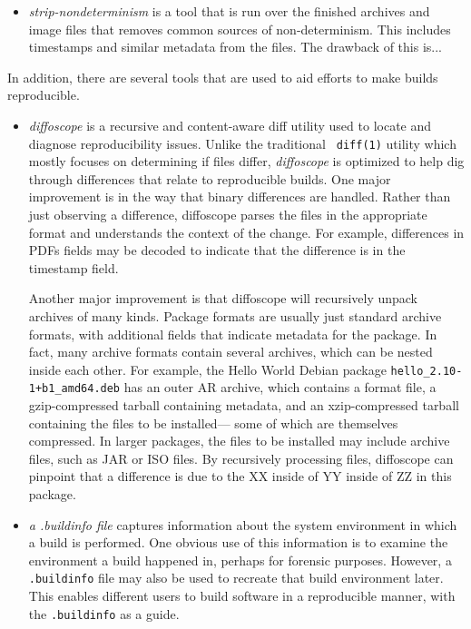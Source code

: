 \begin{itemize}



\item {\em strip-nondeterminism} is a tool that is run over the finished
archives and image files that removes common sources of non-determinism.
This includes timestamps and similar metadata from the files.    The drawback of this is...

\end{itemize}

In addition, there are several tools that are used to aid efforts to make
builds reproducible.

\begin{itemize}

\item {\em diffoscope} is a recursive and content-aware diff utility used
to locate and diagnose reproducibility issues. Unlike the traditional {\tt
diff(1)} utility which mostly focuses on determining if files differ, 
{\em diffoscope} is optimized to help dig through differences that relate 
to reproducible builds.  One major improvement is in the way that binary
differences are handled.  Rather than just observing a difference,
diffoscope parses the files in the appropriate format and understands the
context of the change.  For example, differences in PDFs fields may be
decoded to indicate that the difference is in the timestamp field.

Another major improvement is that diffoscope will recursively unpack 
archives of many kinds.  Package formats are usually just standard archive
formats, with additional fields that indicate metadata for the package.  In
fact, many archive formats contain several archives, which can be nested
inside each other.
For example, the Hello World Debian package \texttt{hello\_2.10-1+b1\_amd64.deb} has an outer AR archive,
which contains
	a format file,
	a gzip-compressed tarball containing metadata,
	and an xzip-compressed tarball containing the files to be installed---%
	some of which are themselves compressed.
In larger packages, the files to be installed may include archive files, such as JAR or ISO files.
By
recursively processing files, diffoscope can pinpoint that a difference is
due to the XX inside of YY inside of ZZ in this package.

\item {\em a .buildinfo file} captures information about the system
environment in which a build is performed.  One obvious use of this
information is to examine the environment a build happened in, perhaps for
forensic purposes.  However, a {\tt .buildinfo} file may also be used to 
recreate that build environment later.  This enables different users to
build software in a reproducible manner, with the {\tt .buildinfo} as a
guide.  


\end{itemize}
